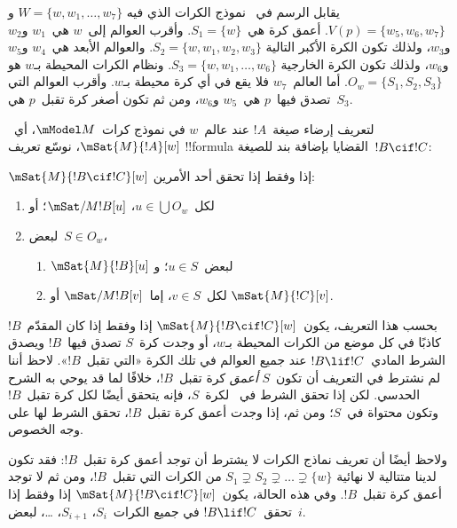 \documentclass[../../../include/open-logic-section]{subfiles}
\begin{document}
يقابل الرسم في~ نموذج الكرات الذي فيه
$W = \{w, w_1, \dots, w_7\}$ و$V(p) = \{w_5, w_6, w_7\}$.
أعمق كرة هي~$S_1 = \{w\}$. وأقرب العوالم إلى~$w$ هي~$w_1$ و$w_2$
و$w_3$، ولذلك تكون الكرة الأكبر التالية
$S_2 = \{w, w_1, w_2, w_3\}$. والعوالم الأبعد هي~$w_4$ و$w_5$
و$w_6$، ولذلك تكون الكرة الخارجية
$S_3 = \{w, w_1, \dots, w_6\}$. ونظام الكرات المحيطة بـ$w$ هو
$O_w = \{S_1, S_2, S_3\}$. أما العالم~$w_7$ فلا يقع في أي كرة
محيطة بـ$w$. وأقرب العوالم التي تصدق فيها~$p$ هي~$w_5$ و$w_6$،
ومن ثم تكون أصغر كرة تقبل~$p$ هي~$S_3$.

لتعريف إرضاء صيغة~$!A$ عند عالم~$w$ في نموذج كرات~$\mModel M$،
أي~$\mSat{M}{!A}[w]$، نوسّع تعريف !!{formula} القضايا بإضافة بند
للصيغة~$!B \cif !C$:

\begin{defn}
  $\mSat{M}{!B \cif !C}[w]$ إذا وفقط إذا تحقق أحد الأمرين:
  \begin{enumerate}
  \item{} لكل~$u \in \bigcup O_w$،
    $\mSat/{M}{!B}[u]$؛ أو
  \item{} لبعض~$S \in O_w$،
    \begin{enumerate}
      \item $\mSat{M}{!B}[u]$ لبعض~$u \in S$؛ و
      \item لكل~$v \in S$، إما~$\mSat/{M}{!B}[v]$ أو
        $\mSat{M}{!C}[v]$.
    \end{enumerate}
  \end{enumerate}
\end{defn}

بحسب هذا التعريف، يكون~$\mSat{M}{!B \cif !C}[w]$ إذا وفقط إذا كان
المقدّم~$!B$ كاذبًا في كل موضع من الكرات المحيطة بـ$w$، أو وجدت
كرة~$S$ تصدق فيها~$!B$ ويصدق الشرط المادي~$!B \lif !C$ عند جميع
العوالم في تلك الكرة «التي تقبل~$!B$». لاحظ أننا لم نشترط في التعريف
أن تكون~$S$ \emph{أعمق} كرة تقبل~$!B$، خلافًا لما قد يوحي به الشرح
الحدسي. لكن إذا تحقق الشرط في~ لكرة~$S$، فإنه
يتحقق أيضًا لكل كرة تقبل~$!B$ وتكون محتواة في~$S$؛ ومن ثم، إذا وجدت
أعمق كرة تقبل~$!B$، تحقق الشرط لها على وجه الخصوص.

ولاحظ أيضًا أن تعريف نماذج الكرات لا يشترط أن توجد أعمق كرة تقبل~$!B$:
فقد تكون لدينا متتالية لا نهائية
$S_1 \supsetneq S_2 \supsetneq \dots \supsetneq \{w\}$ من الكرات
التي تقبل~$!B$، ومن ثم لا توجد أعمق كرة تقبل~$!B$. وفي هذه الحالة،
يكون~$\mSat{M}{!B \cif !C}[w]$ إذا وفقط إذا تحقق~$!B \lif !C$
في جميع الكرات~$S_i$، $S_{i+1}$، \dots، لبعض~$i$.
\end{document}
